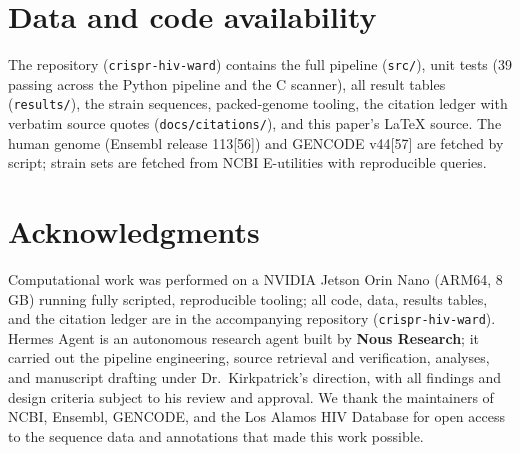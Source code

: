 \documentclass[11pt]{article}
\newcommand{\src}[1]{[#1]}
\begin{document}
\section{Data and code availability}
The repository (\texttt{crispr-hiv-ward}) contains the full pipeline
(\texttt{src/}), unit tests (39 passing across the Python pipeline and the C
scanner), all result tables (\texttt{results/}), the strain sequences,
packed-genome tooling, the citation ledger with verbatim source quotes
(\texttt{docs/citations/}), and this paper's \LaTeX{} source. The human
genome (Ensembl release 113\src{56}) and GENCODE v44\src{57} are fetched by
script; strain sets are fetched from NCBI E-utilities with reproducible
queries.

\section*{Acknowledgments}
Computational work was performed on a NVIDIA Jetson Orin Nano (ARM64,
8\,GB) running fully scripted, reproducible tooling; all code, data,
results tables, and the citation ledger are in the accompanying repository
(\texttt{crispr-hiv-ward}). Hermes Agent is an autonomous research agent
built by \textbf{Nous Research}; it carried out the pipeline engineering,
source retrieval and verification, analyses, and manuscript drafting under
Dr.\ Kirkpatrick's direction, with all findings and design criteria subject
to his review and approval. We thank the maintainers of NCBI, Ensembl,
GENCODE, and the Los Alamos HIV Database for open access to the sequence
data and annotations that made this work possible.


\end{document}
